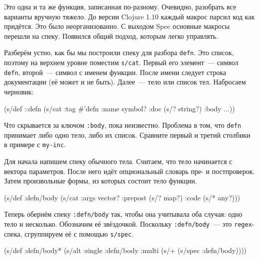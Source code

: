 \fi

Это одна и та же функция, записанная по-разному. Очевидно, разобрать все
варианты вручную тяжело. До версии Clojure 1.10 каждый макрос парсил код как
придётся. Это было неорганизованно. С выходом Spec основные макросы перешли на
спеку. Появился общий подход, которым легко управлять.


Разберём устно, как бы мы построили спеку для разбора \verb|defn|. Это список,
поэтому на верхнем уровне поместим \verb|s/cat|. Первый его элемент~--- символ
\verb|defn|, второй~--- символ с именем функции. После имени следует строка
документации (её может и не быть). Далее~--- тело или список тел. Набросаем
черновик:

\begin{english}
  \begin{clojure}
(s/def ::defn
  (s/cat :tag #{'defn}
         :name symbol?
         :doc (s/? string?)
         :body ...))
  \end{clojure}
\end{english}

Что скрывается за ключом \verb|:body|, пока неизвестно. Проблема в том, что
\verb|defn| принимает либо одно тело, либо их список. Сравните первый и третий
столбики в примере с \verb|my-inc|.

Для начала напишем спеку обычного тела. Считаем, что тело начинается с вектора
параметров. После него идёт опциональный словарь пре- и постпроверок. Затем
произвольные формы, из которых состоит тело функции.

\begin{english}
  \begin{clojure}
(s/def :defn/body
  (s/cat :args vector?
         :prepost (s/? map?)
         :code (s/* any?)))
  \end{clojure}
\end{english}

Теперь обернём спеку \verb|:defn/body| так, чтобы она учитывала оба
случая: одно тело и несколько. Обозначим её звёздочкой. Поскольку
\verb|:defn/body|~--- это \verb|regex|-спека, сгруппируем её с помощью
\verb|s/spec|.

\ifx\DEVICETYPE\MOBILE

\begin{english}
  \begin{clojure}
(s/def :defn/body*
  (s/alt :single :defn/body
         :multi (s/+
                  (s/spec :defn/body))))
  \end{clojure}
\end{english}

